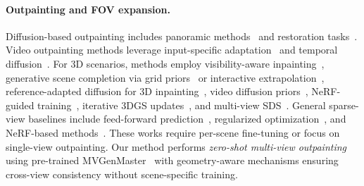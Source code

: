 \documentclass[runningheads]{llncs}
\begin{document}
\paragraph{Outpainting and FOV expansion.}
Diffusion-based outpainting includes panoramic methods~\cite{zhang2024continuous,wu2023panodiffusion,kalischek2025cubediff,yuan2025camfreediff,feng2023diffusion360,shi2023fishdreamer,yu2024shadow,zhang2024taming,lu2024autoregressive,liu2024panofree} and restoration tasks~\cite{tsai2025lightsout,liu2025corrfill}. Video outpainting methods leverage input-specific adaptation~\cite{wang2024your} and temporal diffusion~\cite{zhang2024avid}. For 3D scenarios, methods employ visibility-aware inpainting~\cite{liu2024novel,wu2025aurafusion360}, generative scene completion via grid priors~\cite{weber2024nerfiller} or interactive extrapolation~\cite{yu2025wonderworld}, reference-adapted diffusion for 3D inpainting~\cite{mirzaei2024reffusion}, video diffusion priors~\cite{liu2024novel}, NeRF-guided training~\cite{yu2024nerf}, iterative 3DGS updates~\cite{yu2025unboxed}, and multi-view SDS~\cite{chen2024mvip}. General sparse-view baselines include feed-forward prediction~\cite{charatan2024pixelsplat,chen2024mvsplat}, regularized optimization~\cite{paliwal2024coherentgs,xu2024sparp}, and NeRF-based methods~\cite{wang2023sparsenerf,yang2023freenerf,niemeyer2022regnerf,lin2025frugalnerf,su2024boostmvsnerfs}. These works require per-scene fine-tuning or focus on single-view outpainting. Our method performs \emph{zero-shot multi-view outpainting} using pre-trained MVGenMaster~\cite{cao2025mvgenmaster} with geometry-aware mechanisms ensuring cross-view consistency without scene-specific training.


\end{document}
